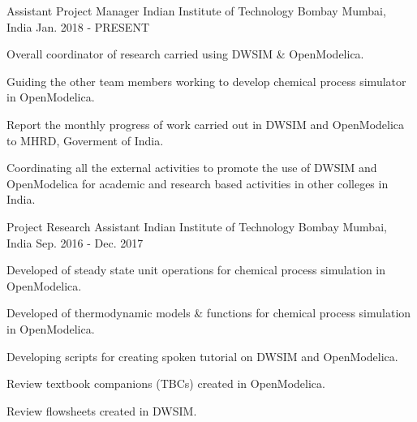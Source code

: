 

\begin{cventries}

  \cventry
    {Assistant Project Manager} %
    {Indian Institute of Technology Bombay} %
    {Mumbai, India} %
    {Jan. 2018 - PRESENT} %
    {
      \begin{cvitems} %
        \item {Overall coordinator of research carried using DWSIM \& OpenModelica.}
        \item {Guiding the other team members working to develop chemical process simulator in OpenModelica.}
        \item {Report the monthly progress of work carried out in DWSIM and OpenModelica to MHRD, Goverment of India.}
        \item {Coordinating all the external activities to promote the use of DWSIM and OpenModelica for academic and research based activities in other colleges in India.}
      \end{cvitems}
    }

  \cventry
    {Project Research Assistant} %
    {Indian Institute of Technology Bombay} %
    {Mumbai, India} %
    {Sep. 2016 - Dec. 2017} %
    {
      \begin{cvitems} %
        \item {Developed of steady state unit operations for chemical process simulation in OpenModelica.}
        \item {Developed of thermodynamic models \& functions for chemical process simulation in OpenModelica.}
        \item {Developing scripts for creating spoken tutorial on DWSIM and OpenModelica.}
        \item {Review textbook companions (TBCs) created in OpenModelica.}
        \item {Review flowsheets created in DWSIM.}
      \end{cvitems}
    }


\end{cventries}
